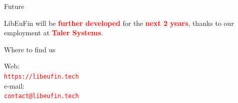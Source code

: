 \documentclass[pdf]{beamer}
\newcommand{\boldred}[1]{\textcolor{red}{\textbf{#1}}}
\begin{document}
\begin{frame}{Future}
  \begin{center}
  LibEuFin will be \boldred{further developed} for the \boldred{next 2 years},
  thanks to our employment at \boldred{Taler Systems}.
  \end{center}
\end{frame}

\begin{frame}{Where to find us}
  \begin{center}
  Web: \\ \textcolor{red}{\tt{https://libeufin.tech}} \\
  e-mail: \\ \textcolor{red}{\tt{contact@libeufin.tech}}
  \end{center}
\end{frame}
\end{document}
